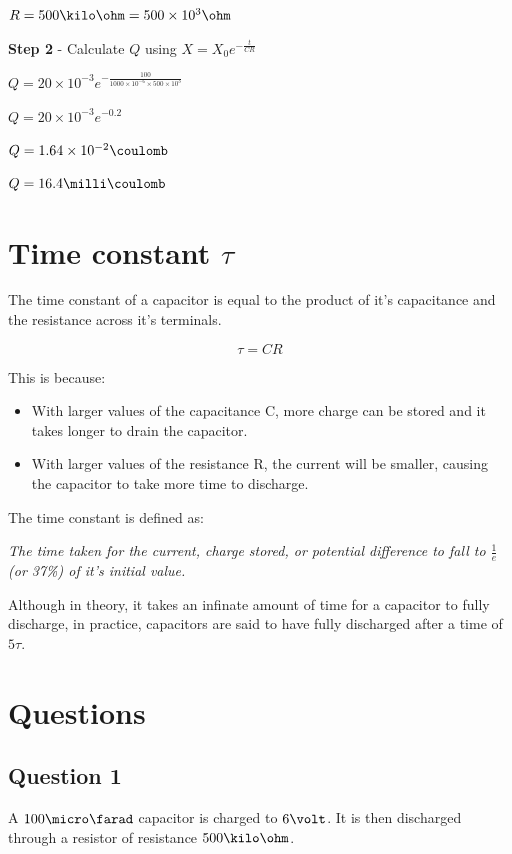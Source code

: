\documentclass{article}
\begin{document}
$R = 500\kilo\ohm = 500\times10^3\ohm$

{\bf Step 2} - Calculate $Q$ using $X = X_0e^{-\frac{t}{CR}}$

$Q = 20\times10^{-3}e^{-\frac{100}{1000\times10^{-6} \times 500\times10^3}}$

$Q = 20\times10^{-3}e^{-0.2}$

$Q = 1.64\times10^{-2}\coulomb$

$Q = 16.4\milli\coulomb$

\section*{Time constant $\tau$}

The time constant of a capacitor is equal to the product of it's capacitance and
the resistance across it's terminals.

\[
	\tau = CR
\]

This is because:

\begin{itemize}

	\item With larger values of the capacitance C, more charge can be stored and
	it takes longer to drain the capacitor.

	\item With larger values of the resistance R, the current will be smaller,
	causing the capacitor to take more time to discharge.

\end{itemize}

The time constant is defined as:

{\it The time taken for the current, charge stored, or potential difference to
fall to $\frac{1}{e}$ (or 37\%) of it's initial value.}

Although in theory, it takes an infinate amount of time for a capacitor to fully
discharge, in practice, capacitors are said to have fully discharged after a
time of $5\tau$.

\section*{Questions}

\subsection*{Question 1}

A $100\micro\farad$ capacitor is charged to $6\volt$. It is then discharged
through a resistor of resistance $500\kilo\ohm$.
\end{document}
